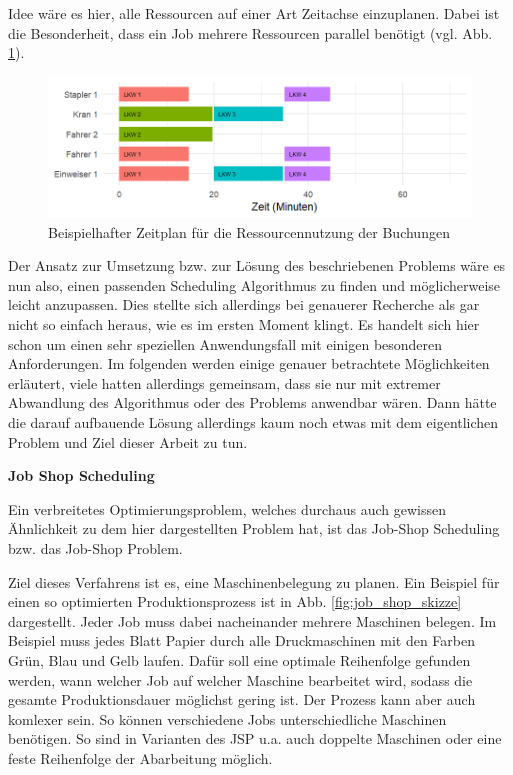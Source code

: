Idee wäre es hier, alle Ressourcen auf einer Art Zeitachse einzuplanen. Dabei ist die Besonderheit, dass ein Job mehrere Ressourcen parallel benötigt (vgl. Abb. \ref{fig:rsExampleSchedule}).
\begin{figure}[H]
    \centering
    \includegraphics[width=\textwidth]{images/timelines/rsExampleSchedule.png}
    \caption{Beispielhafter Zeitplan für die Ressourcennutzung der Buchungen}
    \label{fig:rsExampleSchedule}
\end{figure}

Der Ansatz zur Umsetzung bzw. zur Lösung des beschriebenen Problems wäre es nun also, einen passenden Scheduling Algorithmus zu finden und möglicherweise leicht anzupassen. Dies stellte sich allerdings bei genauerer Recherche als gar nicht so einfach heraus, wie es im ersten Moment klingt. Es handelt sich hier schon um einen sehr speziellen Anwendungsfall mit einigen besonderen Anforderungen. Im folgenden werden einige genauer betrachtete Möglichkeiten erläutert, viele hatten allerdings gemeinsam, dass sie nur mit extremer Abwandlung des Algorithmus oder des Problems anwendbar wären. Dann hätte die darauf aufbauende Lösung allerdings kaum noch etwas mit dem eigentlichen Problem und Ziel dieser Arbeit zu tun.

\textbf{Job Shop Scheduling}

Ein verbreitetes Optimierungsproblem, welches durchaus auch gewissen Ähnlichkeit zu dem hier dargestellten Problem hat, ist das Job-Shop Scheduling bzw. das Job-Shop Problem.

Ziel dieses Verfahrens ist es, eine Maschinenbelegung zu planen. Ein Beispiel für einen so optimierten Produktionsprozess ist in Abb. \ref{fig:job_shop_skizze} dargestellt. Jeder Job muss dabei nacheinander mehrere Maschinen belegen. Im Beispiel muss jedes Blatt Papier durch alle Druckmaschinen mit den Farben Grün, Blau und Gelb laufen. Dafür soll eine optimale Reihenfolge gefunden werden, wann welcher Job auf welcher Maschine bearbeitet wird, sodass die gesamte Produktionsdauer möglichst gering ist. Der Prozess kann aber auch komlexer sein. So können verschiedene Jobs unterschiedliche Maschinen benötigen. So sind in Varianten des JSP u.a. auch doppelte Maschinen oder eine feste Reihenfolge der Abarbeitung möglich. \cite{jobshop1}

